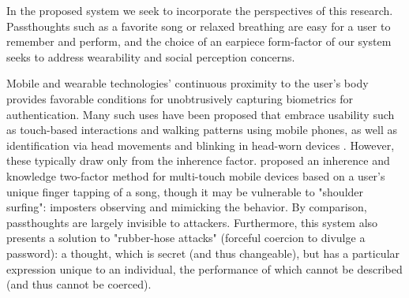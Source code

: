 \documentclass{sigchi}
\begin{document}
In the proposed system we seek to incorporate the perspectives of this research. Passthoughts such as a favorite song or relaxed breathing are easy for a user to remember and perform, and the choice of an earpiece form-factor of our system seeks to address wearability and social perception concerns.

Mobile and wearable technologies' continuous proximity to the user's body provides favorable conditions for unobtrusively capturing biometrics for authentication. Many such uses have been proposed that embrace usability such as touch-based interactions \cite{Tartz2015, Holz2015} and walking patterns \cite{Lu2014} using mobile phones, as well as identification via head movements and blinking in head-worn devices \cite{Rogers2015}. However, these typically draw only from the inherence factor. \cite{Chen2015} proposed an inherence and knowledge two-factor method for multi-touch mobile devices based on a user's unique finger tapping of a song, though it may be vulnerable to "shoulder surfing": imposters observing and mimicking the behavior. By comparison, passthoughts are largely invisible to attackers. Furthermore, this system also presents a solution to "rubber-hose attacks" (forceful coercion to divulge a password): a thought, which is secret (and thus changeable), but has a particular expression unique to an individual, the performance of which cannot be described (and thus cannot be coerced).



\end{document}
